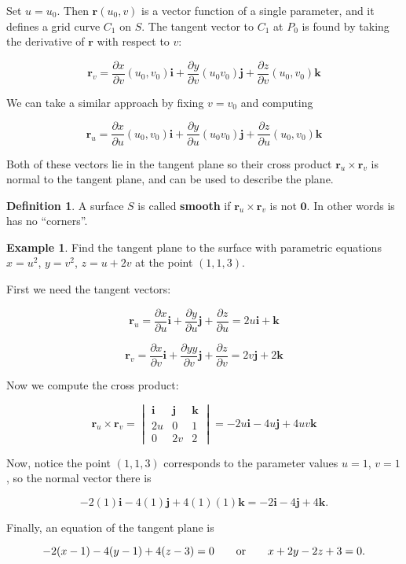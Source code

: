 \documentclass[11pt,oneside,english]{amsart}
\theoremstyle{definition}
\newtheorem*{example}{Example}
\newtheorem*{definition}{Definition}
\newcommand{\ospace}{\hspace{7mm}\text{or}\hspace{7mm}}
\newcommand{\pp}[2]{\frac{\partial{#1}}{\partial{#2}}}
\begin{document}
Set $u=u_0$. Then $\mathbf{r}(u_0,v)$ is a vector function of a single parameter, and it defines a grid curve $C_1$ on $S$. The tangent vector to $C_1$ at $P_0$ is found by taking the derivative of $\mathbf{r}$ with respect to $v$:

\[
\mathbf{r}_v=\pp{x}{v}(u_0,v_0)\mathbf{i}+\pp{y}{v}(u_0v_0)\mathbf{j}+\pp{z}{v}(u_0,v_0)\mathbf{k}
\]

We can take a similar approach by fixing $v=v_0$ and computing

\[
\mathbf{r}_u=\pp{x}{u}(u_0,v_0)\mathbf{i}+\pp{y}{u}(u_0v_0)\mathbf{j}+\pp{z}{u}(u_0,v_0)\mathbf{k}
\]

Both of these vectors lie in the tangent plane so their cross product $\mathbf{r}_u\times\mathbf{r}_v$ is normal to the tangent plane, and can be used to describe the plane.

\begin{definition}
A surface $S$ is called \textbf{smooth} if $\mathbf{r}_u\times\mathbf{r}_v$ is not $\mathbf{0}$. In other words is has no ``corners''.
\end{definition}

\pagebreak

\begin{example}
Find the tangent plane to the surface with parametric equations $x=u^2$, $y=v^2$, $z=u+2v$ at the point $(1,1,3)$.

First we need the tangent vectors:

\[
\mathbf{r}_u=\pp{x}{u}\mathbf{i}+\pp{y}{u}\mathbf{j}+\pp{z}{u}=2u\mathbf{i}+\mathbf{k}
\]

\[
\mathbf{r}_v=\pp{x}{v}\mathbf{i}+\pp{yy}{v}\mathbf{j}+\pp{z}{v}=2v\mathbf{j}+2\mathbf{k}
\]

Now we compute the cross product:

\[
\mathbf{r}_u\times\mathbf{r}_v=\begin{vmatrix}\mathbf{i}&\mathbf{j}&\mathbf{k}\\ 2u & 0 & 1 \\0 & 2v & 2\end{vmatrix}=-2u\mathbf{i}-4u\mathbf{j}+4uv\mathbf{k}
\]

Now, notice the point $(1,1,3)$ corresponds to the parameter values $u=1$, $v=1$, so the normal vector there is

\[
-2(1)\mathbf{i}-4(1)\mathbf{j}+4(1)(1)\mathbf{k}=-2\mathbf{i}-4\mathbf{j}+4\mathbf{k}.
\]

Finally, an equation of the tangent plane is

\[
-2(x-1)-4(y-1)+4(z-3)=0\ospace x+2y-2z+3=0.
\]
\end{example}
\end{document}
